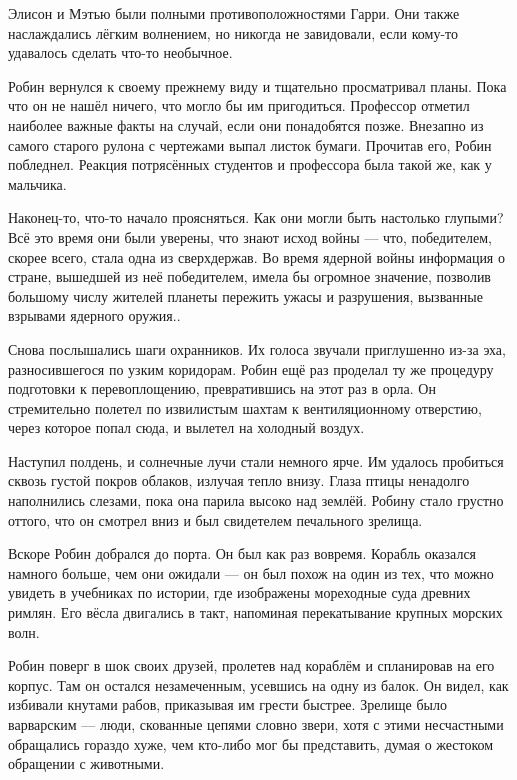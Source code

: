 \documentclass[a4paper,12pt]{book}
\begin{document}
\par
Элисон и Мэтью были полными противоположностями Гарри. Они также наслаждались лёгким волнением, но никогда не завидовали, если кому-то удавалось сделать что-то необычное.
\par
Робин вернулся к своему прежнему виду и тщательно просматривал планы. Пока что он не нашёл ничего, что могло бы им пригодиться. Профессор отметил наиболее важные факты на случай, если они понадобятся позже. Внезапно из самого старого рулона с чертежами выпал листок бумаги. Прочитав его, Робин побледнел. Реакция потрясённых студентов и профессора была такой же, как у мальчика.
\par
Наконец-то, что-то начало проясняться. Как они могли быть настолько глупыми? Всё это время они были уверены, что знают исход войны — что, победителем, скорее всего, стала одна из сверхдержав. Во время ядерной войны информация о стране, вышедшей из неё победителем,  имела бы огромное значение, позволив большому числу жителей планеты пережить ужасы и разрушения, вызванные взрывами ядерного оружия..\\
\par
Снова послышались шаги охранников. Их голоса звучали приглушенно из-за эха, разносившегося по узким коридорам. Робин ещё раз проделал ту же процедуру подготовки к перевоплощению, превратившись на этот раз в орла. Он стремительно полетел по извилистым шахтам к вентиляционному отверстию, через которое попал сюда, и вылетел на холодный воздух.\\
\par
Наступил полдень, и солнечные лучи стали немного ярче. Им удалось пробиться сквозь густой покров облаков, излучая тепло внизу. Глаза птицы ненадолго наполнились слезами, пока она парила высоко над землёй. Робину стало грустно оттого, что он смотрел вниз и был свидетелем печального зрелища.\\
\par
Вскоре Робин добрался до порта. Он был как раз вовремя. Корабль оказался намного больше, чем они ожидали — он был похож на один из тех, что можно увидеть в учебниках по истории, где изображены мореходные суда древних римлян. Его вёсла двигались в такт, напоминая перекатывание крупных морских волн.
\par
Робин поверг в шок своих друзей, пролетев над кораблём и спланировав на его корпус. Там он остался незамеченным, усевшись на одну из балок. Он видел, как избивали кнутами рабов, приказывая им грести быстрее. Зрелище было варварским — люди, скованные цепями словно звери, хотя с этими несчастными обращались гораздо хуже, чем кто-либо мог бы представить, думая о жестоком обращении с животными.
\end{document}
